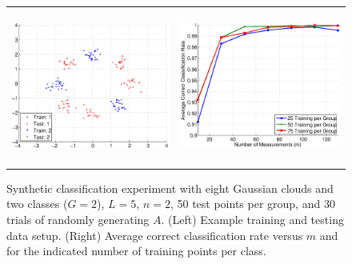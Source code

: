 \documentclass[twoside,11pt]{article}
\begin{document}
\begin{figure}[!htbp]
\centering
\begin{tabular}{cc}
\includegraphics[height=2in]{images/Synthetic/8ball_g2_d2/synthetic_3a.eps} &
\includegraphics[height=2in]{images/Synthetic/8ball_g2_d2/synthetic_3b.eps} \\
\end{tabular}
\caption{Synthetic classification experiment with eight Gaussian clouds and two classes ($G=2$), $L=5$, $n=2$, 50 test points per group, and 30 trials of randomly generating $A$. (Left) Example training and testing data setup. (Right) Average correct classification rate versus $m$ and for the indicated number of training points per class.}
\label{syn:gaussian2 alternating8}
\end{figure}
\end{document}
